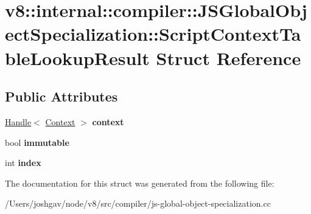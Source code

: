 \hypertarget{structv8_1_1internal_1_1compiler_1_1_j_s_global_object_specialization_1_1_script_context_table_lookup_result}{}\section{v8\+:\+:internal\+:\+:compiler\+:\+:J\+S\+Global\+Object\+Specialization\+:\+:Script\+Context\+Table\+Lookup\+Result Struct Reference}
\label{structv8_1_1internal_1_1compiler_1_1_j_s_global_object_specialization_1_1_script_context_table_lookup_result}
\subsection*{Public Attributes}
\begin{DoxyCompactItemize}
\item 
\hyperlink{classv8_1_1internal_1_1_handle}{Handle}$<$ \hyperlink{classv8_1_1internal_1_1_context}{Context} $>$ {\bfseries context}\hypertarget{structv8_1_1internal_1_1compiler_1_1_j_s_global_object_specialization_1_1_script_context_table_lookup_result_a1630fd9c1f6a16812077489df75981ee}{}\label{structv8_1_1internal_1_1compiler_1_1_j_s_global_object_specialization_1_1_script_context_table_lookup_result_a1630fd9c1f6a16812077489df75981ee}

\item 
bool {\bfseries immutable}\hypertarget{structv8_1_1internal_1_1compiler_1_1_j_s_global_object_specialization_1_1_script_context_table_lookup_result_a8e98b409286ee13c687ec0cf17445267}{}\label{structv8_1_1internal_1_1compiler_1_1_j_s_global_object_specialization_1_1_script_context_table_lookup_result_a8e98b409286ee13c687ec0cf17445267}

\item 
int {\bfseries index}\hypertarget{structv8_1_1internal_1_1compiler_1_1_j_s_global_object_specialization_1_1_script_context_table_lookup_result_a92d56559df1281c79e819a2829e8dcde}{}\label{structv8_1_1internal_1_1compiler_1_1_j_s_global_object_specialization_1_1_script_context_table_lookup_result_a92d56559df1281c79e819a2829e8dcde}

\end{DoxyCompactItemize}


The documentation for this struct was generated from the following file\+:\begin{DoxyCompactItemize}
\item 
/\+Users/joshgav/node/v8/src/compiler/js-\/global-\/object-\/specialization.\+cc\end{DoxyCompactItemize}
